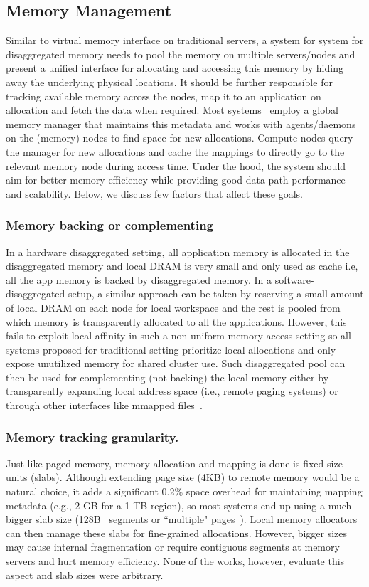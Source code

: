 
\subsection{Memory Management}
Similar to virtual memory interface on traditional servers, a 
system for system for disaggregated memory needs to pool the 
memory on multiple servers/nodes and present a unified interface 
for allocating and accessing this memory by hiding away the 
underlying physical locations. It should be further responsible 
for tracking available memory across the nodes, map it to an  
application on allocation and fetch the data when required. 
Most systems~\cite{legoos,remregions,kona} employ a 
global memory manager that maintains this metadata and works 
with agents/daemons on the (memory) nodes to find space for 
new allocations. Compute nodes query the manager for new allocations 
and cache the mappings to directly go to the relevant memory node 
during access time. Under the hood, the system should aim for better 
memory efficiency while providing good data path performance and 
scalability. Below, we discuss few factors that affect these 
goals.


\subsubsection{Memory backing or complementing}
In a hardware disaggregated setting, all application memory is 
allocated in the disaggregated memory and local DRAM is very small
and only used as cache i.e, all the app memory is backed by 
disaggregated memory. In a software-disaggregated setup, 
a similar approach can be taken by reserving a small amount 
of local DRAM on each node for local workspace and the rest is 
pooled from which memory is transparently allocated to all the 
applications. However, this fails to exploit local affinity in such 
a non-uniform memory access setting so all systems proposed for 
traditional setting prioritize 
local allocations and only expose unutilized memory for shared 
cluster use. Such disaggregated pool can then be used for 
complementing (not backing) the local memory either by transparently 
expanding local address space (i.e., remote paging systems) or 
through other interfaces like mmapped files~\cite{remregions}. 


\subsubsection{Memory tracking granularity.}
Just like paged memory, memory allocation and mapping is done 
is fixed-size units (slabs). Although extending page size (4KB) 
to remote memory would be a natural choice, 
it adds a significant 0.2\% space overhead 
for maintaining mapping metadata (e.g., 2 GB for a 1 TB 
region\cite{remregions}), so most systems end up using a much 
bigger slab size (128B~\cite{remregions} segments or ``multiple" 
pages~\cite{infiniswap,kona}). Local memory allocators can then 
manage these slabs for fine-grained allocations. 
However, bigger sizes may cause internal fragmentation or 
require contiguous segments at memory servers and hurt memory 
efficiency. None of the works, however, evaluate this aspect 
and slab sizes were arbitrary.


